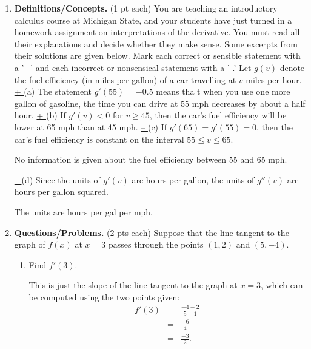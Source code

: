 \documentclass[11pt,letterpaper]{article}
\begin{document}
\begin{enumerate}
\item  \textbf{Definitions/Concepts.} (1 pt each) 
You are teaching an introductory calculus course at
Michigan
State, and your
students have just turned in a homework assignment on
interpretations of
the derivative. You must read all their explanations
and decide whether
they make sense. Some excerpts from their solutions are
given below.
Mark each correct or sensible statement with a '+' and
each incorrect or
nonsensical statement with a '-.'
\vskip 12pt
Let $g(v)$ denote the fuel efficiency (in miles per
gallon) of a car
travelling at $v$ miles per hour.
\vskip 5pt
\underline {\hskip 8pt + \hskip 5pt} (a) The statement $g'(55) =
-0.5$ means tha t
when you use one more gallon of gasoline, the time you
can drive at $55$ mph
decreases by about a half hour.
\vskip 5pt
\underline {\hskip 8pt + \hskip 5pt} (b) If $g'(v) < 0$ for $v
\geq 45$, then the
car's fuel
efficiency will be lower at 65 mph than at 45 mph.
\vskip 5pt
\underline {\hskip 10pt -- \hskip 5pt} (c) If $g'(65) = g'(55) =
0$, then the car's fuel
efficiency is constant on the interval $55 \leq v \leq
65$.

\vspace{.5pc}
No information is given about the fuel efficiency between 55 and 65 mph.

\vskip 5pt
\underline {\hskip 10pt -- \hskip 5pt} (d) Since the units of
$g'(v)$ are hours per gallon,
the units of $g''(v)$ are hours per gallon squared.

\vspace{.5pc}
The units are hours per gal per mph.

\vspace{1pc}
\item \textbf{Questions/Problems.} (2 pts each)  Suppose that the line tangent to the graph of $f(x)$ at $x=3$ passes through the points $(1,2)$ and $(5,-4)$.
\begin{enumerate}
 \item Find $f'(3)$.

\vspace{.5pc}
This is just the slope of the line tangent to the graph at $x=3$, which can be computed using the two points given:
\begin{eqnarray*}
   f'(3) &=& \frac{-4-2}{5-1} \\ 
       &=& \frac{-6}{4} \\
       &=& \frac{-3}{2}.
  \end{eqnarray*}


\end{enumerate}
\end{enumerate}
\end{document}
